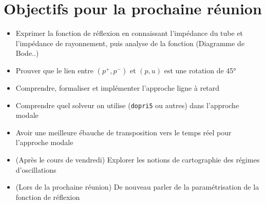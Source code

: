 \documentclass[a4paper, 11pt]{article}
\begin{document}
\section{Objectifs pour la prochaine réunion}
\begin{itemize}
	\item Exprimer la fonction de réflexion en connaissant l'impédance du tube et l'impédance de rayonnement, puis analyse de la fonction (Diagramme de Bode..)
	\item Prouver que le lien entre $(p^{+}, p^{-})$ et $(p,u)$ est une rotation de 45°
	\item Comprendre, formaliser et implémenter l'approche ligne à retard
	\item Comprendre quel solveur on utilise (\texttt{dopri5} ou autres) dans l'approche modale
	\item Avoir une meilleure ébauche de transposition vers le temps réel pour l'approche modale		
	\item (Après le cours de vendredi) Explorer les notions de cartographie des régimes d'oscillations 
	\item (Lors de la prochaine réunion) De nouveau parler de la paramétrisation de la fonction de réflexion
\end{itemize}
\end{document}
